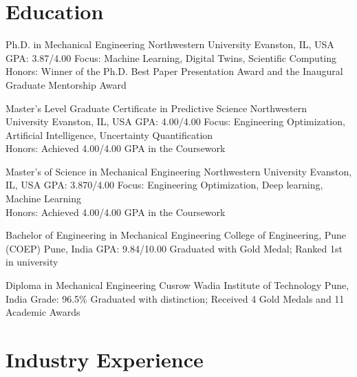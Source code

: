 \documentclass[11pt,a4paper,sans]{moderncv}
\begin{document}
\makecvtitle

\section{\faGraduationCap \space Education}

    {Ph.D. in Mechanical Engineering}
    {Northwestern University}
    {Evanston, IL, USA}
    {GPA: 3.87/4.00}
    {
        Focus: Machine Learning, Digital Twins, Scientific Computing \\
        Honors: Winner of the Ph.D. Best Paper Presentation Award and the Inaugural Graduate Mentorship Award
    }

    {Master's Level Graduate Certificate in Predictive Science}
    {Northwestern University}
    {Evanston, IL, USA}
    {GPA: 4.00/4.00}
    {
        Focus: Engineering Optimization, Artificial Intelligence, Uncertainty Quantification \\
        Honors: Achieved 4.00/4.00 GPA in the Coursework
    }

    {Master's of Science in Mechanical Engineering}
    {Northwestern University}
    {Evanston, IL, USA}
    {GPA: 3.870/4.00}
    {
        Focus: Engineering Optimization, Deep learning, Machine Learning \\
        Honors: Achieved 4.00/4.00 GPA in the Coursework
    }

    {Bachelor of Engineering in Mechanical Engineering}
    {College of Engineering, Pune (COEP)}
    {Pune, India}
    {GPA: 9.84/10.00}
    {Graduated with Gold Medal; Ranked 1st in university}

    {Diploma in Mechanical Engineering}
    {Cusrow Wadia Institute of Technology}
    {Pune, India}
    {Grade: 96.5\%}
    {Graduated with distinction; Received 4 Gold Medals and 11 Academic Awards}


\section{\faBriefcase \space Industry Experience}

\end{document}
